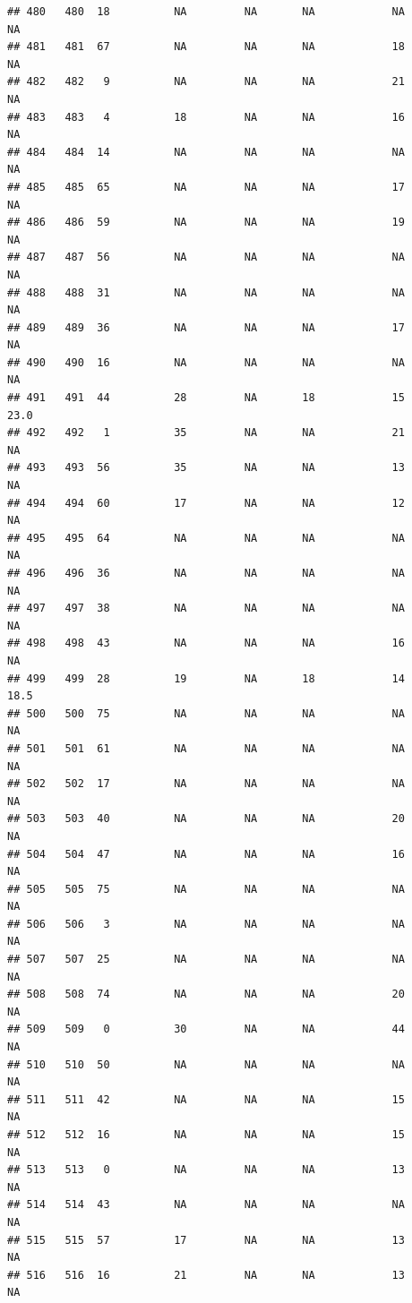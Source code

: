 \documentclass[man]{apa6}
\begin{document}
\begin{verbatim}
## 480   480  18          NA         NA       NA            NA       NA
## 481   481  67          NA         NA       NA            18       NA
## 482   482   9          NA         NA       NA            21       NA
## 483   483   4          18         NA       NA            16       NA
## 484   484  14          NA         NA       NA            NA       NA
## 485   485  65          NA         NA       NA            17       NA
## 486   486  59          NA         NA       NA            19       NA
## 487   487  56          NA         NA       NA            NA       NA
## 488   488  31          NA         NA       NA            NA       NA
## 489   489  36          NA         NA       NA            17       NA
## 490   490  16          NA         NA       NA            NA       NA
## 491   491  44          28         NA       18            15     23.0
## 492   492   1          35         NA       NA            21       NA
## 493   493  56          35         NA       NA            13       NA
## 494   494  60          17         NA       NA            12       NA
## 495   495  64          NA         NA       NA            NA       NA
## 496   496  36          NA         NA       NA            NA       NA
## 497   497  38          NA         NA       NA            NA       NA
## 498   498  43          NA         NA       NA            16       NA
## 499   499  28          19         NA       18            14     18.5
## 500   500  75          NA         NA       NA            NA       NA
## 501   501  61          NA         NA       NA            NA       NA
## 502   502  17          NA         NA       NA            NA       NA
## 503   503  40          NA         NA       NA            20       NA
## 504   504  47          NA         NA       NA            16       NA
## 505   505  75          NA         NA       NA            NA       NA
## 506   506   3          NA         NA       NA            NA       NA
## 507   507  25          NA         NA       NA            NA       NA
## 508   508  74          NA         NA       NA            20       NA
## 509   509   0          30         NA       NA            44       NA
## 510   510  50          NA         NA       NA            NA       NA
## 511   511  42          NA         NA       NA            15       NA
## 512   512  16          NA         NA       NA            15       NA
## 513   513   0          NA         NA       NA            13       NA
## 514   514  43          NA         NA       NA            NA       NA
## 515   515  57          17         NA       NA            13       NA
## 516   516  16          21         NA       NA            13       NA

\end{verbatim}
\end{document}
